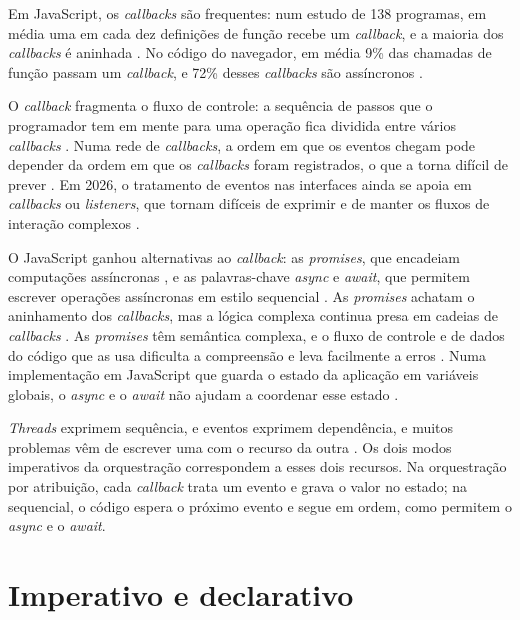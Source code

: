 Em JavaScript, os \emph{callbacks} são frequentes: num estudo de 138 programas, em
média uma em cada dez definições de função recebe um \emph{callback}, e a maioria dos
\emph{callbacks} é aninhada \cite[p. 1]{gallaba2015}.
No código do navegador, em média 9\% das chamadas de função passam um
\emph{callback}, e 72\% desses \emph{callbacks} são assíncronos \cite[p. 6]{gallaba2015}.

O \emph{callback} fragmenta o fluxo de controle: a sequência de passos que o
programador tem em mente para uma operação fica dividida entre vários
\emph{callbacks} \cite[p. 134-135]{fischer2007}.
Numa rede de \emph{callbacks}, a ordem em que os eventos chegam pode depender da
ordem em que os \emph{callbacks} foram registrados, o que a torna difícil de prever
\cite[p. 8]{blackheath2016}.
Em 2026, o tratamento de eventos nas interfaces ainda se apoia em
\emph{callbacks} ou \emph{listeners}, que tornam difíceis de exprimir e de manter os
fluxos de interação complexos \cite[p. 8]{grolaux2026}.

O JavaScript ganhou alternativas ao \emph{callback}: as \emph{promises}, que encadeiam
computações assíncronas \cite[p. 86:1]{madsen2017}, e as palavras-chave
\emph{async} e \emph{await}, que permitem escrever operações assíncronas em estilo
sequencial \cite[p. 9]{grolaux2026}.
As \emph{promises} achatam o aninhamento dos \emph{callbacks}, mas a lógica complexa
continua presa em cadeias de \emph{callbacks} \cite[p. 9]{grolaux2026}.
As \emph{promises} têm semântica complexa, e o fluxo de controle e de dados do
código que as usa dificulta a compreensão e leva facilmente a erros
\cite[p. 162:1]{alimadadi2018}.
Numa implementação em JavaScript que guarda o estado da aplicação em variáveis
globais, o \emph{async} e o \emph{await} não ajudam a coordenar esse estado
\cite[p. 535 e 538]{berry2020}.

\emph{Threads} exprimem sequência, e eventos exprimem dependência, e muitos
problemas vêm de escrever uma com o recurso da outra
\cite[p. 16]{blackheath2016}.
Os dois modos imperativos da orquestração correspondem a esses dois
recursos.
Na orquestração por atribuição, cada \emph{callback} trata um evento e grava o
valor no estado; na sequencial, o código espera o próximo evento e segue
em ordem, como permitem o \emph{async} e o \emph{await}.
\section{Imperativo e declarativo}
\label{sec:imperativo-e-declarativo}

